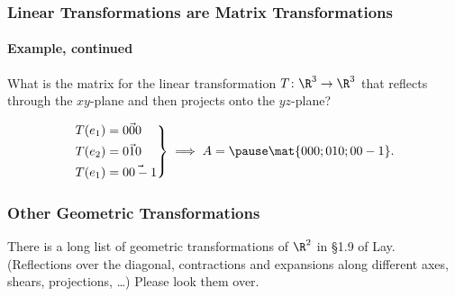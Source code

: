 \begin{frame}
\frametitle{Linear Transformations are Matrix Transformations}
\framesubtitle{Example, continued}

\vskip-3mm
\begin{ques}
  What is the matrix for the linear transformation $T\colon\R^3\to\R^3$ that
  reflects through the $xy$-plane and then projects onto the $yz$-plane?
\end{ques}

\vfill

\[\left.\begin{aligned}
  T(e_1) &= \vec{0 0 0} \\
  T(e_2) &= \vec{0 1 0} \\
  T(e_1) &= \vec{0 0 -1} \\
\end{aligned}\right\}
\implies A = \pause\mat{0 0 0; 0 1 0; 0 0 -1}.
\]

\vfill

\end{frame}



\begin{frame}
\frametitle{Other Geometric Transformations}

\vfill

\begin{bluebox}{.75\textwidth}
  There is a long list of geometric transformations of $\R^2$ in \S1.9 of Lay.
  (Reflections over the diagonal, contractions and expansions along different
  axes, shears, projections, \ldots)
  Please look them over.
\end{bluebox}

\vfill

\end{frame}



